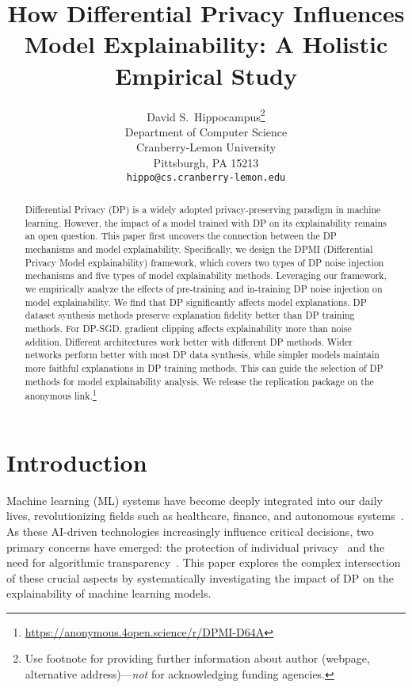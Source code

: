 \documentclass{article}
\title{How Differential Privacy Influences Model Explainability: A Holistic Empirical Study}
\author{%
  David S.~Hippocampus\thanks{Use footnote for providing further information
    about author (webpage, alternative address)---\emph{not} for acknowledging
    funding agencies.} \\
  Department of Computer Science\\
  Cranberry-Lemon University\\
  Pittsburgh, PA 15213 \\
  \texttt{hippo@cs.cranberry-lemon.edu} \\
}
\begin{document}
\maketitle


\begin{abstract}
Differential Privacy (DP) is a widely adopted privacy-preserving paradigm in machine learning. However, the impact of a model trained with DP on its explainability remains an open question. This paper first uncovers the connection between the DP mechanisms and model explainability. Specifically, we design the DPMI (Differential Privacy Model explainability) framework, which covers two types of DP noise injection mechanisms and five types of model explainability methods. Leveraging our framework, we empirically analyze the effects of pre-training and in-training DP noise injection on model explainability. We find that DP significantly affects model explanations. DP dataset synthesis methods preserve explanation fidelity better than DP training methods. For DP-SGD, gradient clipping affects explainability more than noise addition. Different architectures work better with different DP methods. Wider networks perform better with most DP data synthesis, while simpler models maintain more faithful explanations in DP training methods. This can guide the selection of DP methods for model explainability analysis. We release the replication package on the anonymous link.\footnote{\url{https://anonymous.4open.science/r/DPMI-D64A}}

\end{abstract}


\section{Introduction}
Machine learning (ML) systems have become deeply integrated into our daily lives, revolutionizing fields such as healthcare, finance, and autonomous systems~\cite{mohammedtransformative,rane2023towards,gong2024baffle}. As these AI-driven technologies increasingly influence critical decisions, two primary concerns have emerged: the protection of individual privacy~\cite{khalid2023privacy} and the need for algorithmic transparency~\cite{angelov2021explainable}. This paper explores the complex intersection of these crucial aspects by systematically investigating the impact of DP on the explainability of machine learning models.
\end{document}
